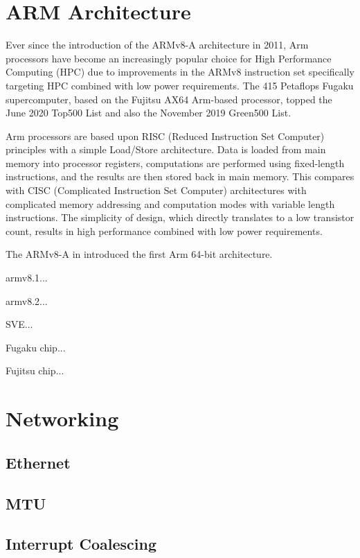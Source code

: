 
%
%
\section{ARM Architecture}

Ever since the introduction of the ARMv8-A architecture in 2011, Arm processors have become an increasingly popular choice for High Performance Computing (HPC) due to improvements in the ARMv8 instruction set specifically targeting HPC combined with low power requirements. The 415 Petaflops Fugaku supercomputer, based on the Fujitsu AX64 Arm-based processor, topped the June 2020 Top500 List and also the November 2019 Green500 List.

Arm processors are based upon RISC (Reduced Instruction Set Computer) principles with a simple Load/Store architecture. Data is loaded from main memory into processor registers, computations are performed using fixed-length instructions, and the results are then stored back in main memory. This compares with CISC (Complicated Instruction Set Computer) architectures with complicated memory addressing and computation modes with variable length instructions. The simplicity of design, which directly translates to a low transistor count, results in high performance combined with low power requirements.

The ARMv8-A in introduced the first Arm 64-bit architecture.

armv8.1...

armv8.2...

SVE...

Fugaku chip...

Fujitsu chip... 








%
%
\section{Networking}

\subsection{Ethernet}

\subsection{MTU}

\subsection{Interrupt Coalescing}

